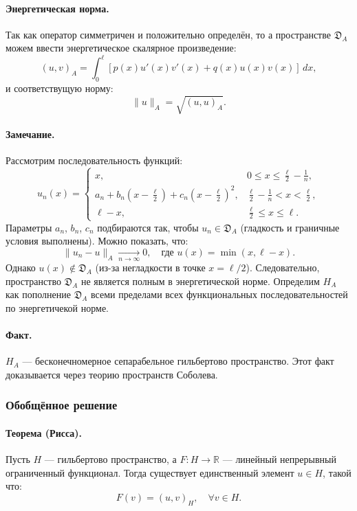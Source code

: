 \paragraph{Энергетическая норма.} Так как оператор симметричен и положительно определён, то а пространстве $ \mathfrak{D}_A $ можем ввести энергетическое скалярное произведение:
\[
(u, v)_A = \int_0^\ell \left[ p(x) u'(x) v'(x) + q(x) u(x) v(x) \right] \, dx,
\]
и соответствущую норму:
\[
\|u\|_A = \sqrt{(u, u)_A}.
\]

\paragraph{Замечание.} Рассмотрим последовательность функций:
\[
u_n(x) =
\begin{cases}
x, & 0 \le x \le \frac{\ell}{2} - \frac{1}{n}, \\
a_n + b_n(x - \frac{\ell}{2}) + c_n(x - \frac{\ell}{2})^2, & \frac{\ell}{2} - \frac{1}{n} < x < \frac{\ell}{2}, \\
\ell - x, & \frac{\ell}{2} \le x \le \ell.
\end{cases}
\]
Параметры $a_n$, $b_n$, $c_n$ подбираются так, чтобы $u_n \in \mathfrak{D}_A$ (гладкость и граничные условия выполнены).
Можно показать, что:
\[
\|u_n - u\|_A \xrightarrow[n \to \infty]{} 0, \quad \text{где } u(x) = \min(x, \ell - x).
\]
Однако $u(x) \notin \mathfrak{D}_A$ (из-за негладкости в точке $x = \ell/2$).
Следовательно, пространство $\mathfrak{D}_A$ не является полным в энергетической норме. Определим  $H_A$ как пополнение $\mathfrak{D}_A$ всеми пределами всех функциональных последовательностей по энергетичекой норме.

\paragraph{Факт.} $H_A$ — бесконечномерное сепарабельное гильбертово пространство. Этот факт доказывается через теорию пространств Соболева.

\subsubsection{Обобщённое решение}

\paragraph{Теорема (Рисса).}
Пусть $H$ — гильбертово пространство, а $F: H \to \mathbb{R}$ — линейный непрерывный ограниченный функционал. Тогда существует единственный элемент $u \in H$, такой что:
\[
F(v) = (u, v)_H, \quad \forall v \in H.
\]


